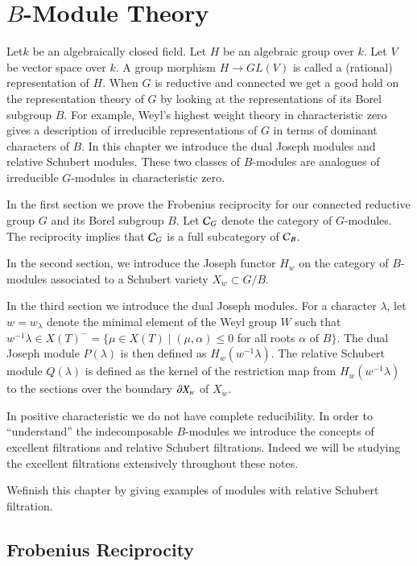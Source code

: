\chapter{$B$-Module Theory}\label{chap2}

Let\pageoriginale $k$ be an algebraically closed field. Let $H$ be an
algebraic group over $k$. Let $V$ be vector space over $k$. A group
morphism $H\to GL(V)$ is called a (rational) representation of
$H$. When $G$ is reductive and connected we get a good hold on the
representation theory of $G$ by looking at the representations of its
Borel subgroup $B$. For example, Weyl's 
highest weight theory in
characteristic zero gives a description of irreducible representations
of $G$ in terms of dominant characters of $B$. In this chapter we
introduce the dual Joseph modules and relative Schubert modules. These
two classes of $B$-modules are analogues of irreducible $G$-modules in
characteristic zero.

\label{page9}
In the first section we prove the Frobenius reciprocity for our
connected reductive group $G$ and its Borel subgroup $B$. Let $\mathcal{C}_{G}$
denote the category of $G$-modules. The reciprocity implies that
$\mathcal{C}_{G}$ is a full subcategory of $\mathcal{C}_{B}$.

In the second section, we introduce the Joseph functor $H_{w}$ on the
category of $B$-modules associated to a Schubert variety $X_{w}\subset
G/B$.

In the third section we introduce the dual Joseph modules. For a
character $\lambda$, let $w=w_{\lambda}$ denote the minimal element of
the Weyl group $W$ such that $w^{-1}\lambda \in X(T)^{-}=\{\mu\in
X(T)\mid (\mu,\alpha)\leq 0$ for all roots $\alpha$ of $B\}$. The dual
Joseph module $P(\lambda)$ is then defined as
$H_{w}(w^{-1}\lambda)$. The relative Schubert module $Q(\lambda)$ is
defined as the kernel of the restriction map from
$H_{w}(w^{-1}\lambda)$ to the sections over the boundary $\partial X_{w}$ of
$X_{w}$. 

In positive characteristic we do not have complete reducibility. In
order to ``understand'' the indecomposable $B$-modules we introduce
the concepts of excellent filtrations and relative Schubert
filtrations. Indeed we will be studying the excellent filtrations
extensively throughout these notes.

We\pageoriginale finish this chapter by giving examples of modules
with relative Schubert filtration.

\section{Frobenius Reciprocity}\label{chap2-sec2.1}

